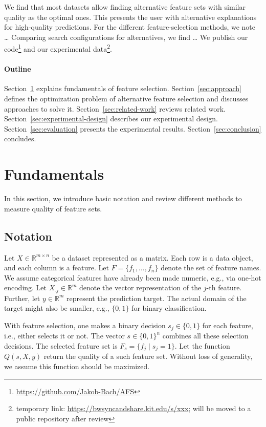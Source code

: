 \documentclass{article}
\theoremstyle{definition}
\begin{document}
We find that most datasets allow finding alternative feature sets with similar quality as the optimal ones.
This presents the user with alternative explanations for high-quality predictions.
For the different feature-selection methods, we note \dots
Comparing search configurations for alternatives, we find \dots
We publish our code\footnote{\url{https://github.com/Jakob-Bach/AFS}} and our experimental data\footnote{temporary link: \url{https://bwsyncandshare.kit.edu/s/xxx}; will be moved to a public repository after review}.

\paragraph{Outline}

Section~\ref{sec:fundamentals} explains fundamentals of feature selection.
Section~\ref{sec:approach} defines the optimization problem of alternative feature selection and discusses approaches to solve it.
Section~\ref{sec:related-work} reviews related work.
Section~\ref{sec:experimental-design} describes our experimental design.
Section~\ref{sec:evaluation} presents the experimental results.
Section~\ref{sec:conclusion} concludes.

\section{Fundamentals}
\label{sec:fundamentals}

In this section, we introduce basic notation and review different methods to measure quality of feature sets.

\subsection{Notation}
\label{sec:fundamentals:notation}

Let $X \in \mathbb{R}^{m \times n}$ be a dataset represented as a matrix.
Each row is a data object, and each column is a feature.
Let $F = \{f_1, \dots, f_n\}$ denote the set of feature names.
We assume categorical features have already been made numeric, e.g., via one-hot encoding.
Let $X_{\cdot{}j} \in \mathbb{R}^m$ denote the vector representation of the $j$-th feature.
Further, let $y \in \mathbb{R}^m$ represent the prediction target.
The actual domain of the target might also be smaller, e.g., $\{0,1\}$ for binary classification.

With feature selection, one makes a binary decision $s_j \in \{0,1\}$ for each feature, i.e., either selects it or not.
The vector $s \in \{0,1\}^n$ combines all these selection decisions.
The selected feature set is $F_s = \{f_j \mid s_j=1\}$.
Let the function $Q(s,X,y)$ return the quality of a such feature set.
Without loss of generality, we assume this function should be maximized.
\end{document}
